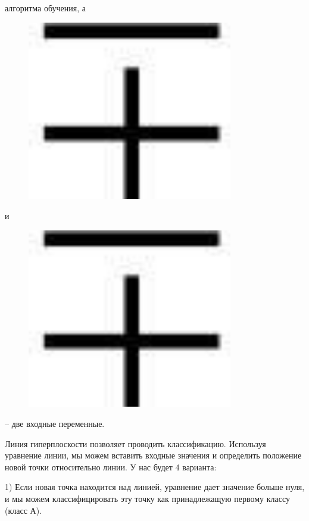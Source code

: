 алгоритма обучения, а \begin{figure}[H]
	\centering
	\includegraphics[width=0.8\textwidth]{assets/27}
	\caption*{}
\end{figure} и
\begin{figure}[H]
	\centering
	\includegraphics[width=0.8\textwidth]{assets/28}
	\caption*{}
\end{figure} -- две входные переменные.

Линия гиперплоскости позволяет проводить классификацию. Используя
уравнение линии, мы можем вставить входные значения и определить
положение новой точки относительно линии. У нас будет 4 варианта:

1) Если новая точка находится над линией, уравнение дает значение больше
нуля, и мы можем классифицировать эту точку как принадлежащую первому
классу (класс А).

